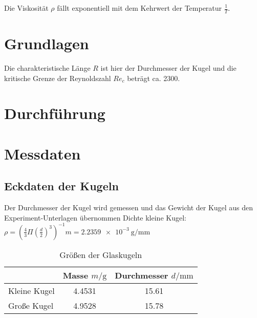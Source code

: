 Die Viskosität $\rho$ fällt exponentiell mit dem Kehrwert der Temperatur $\frac{1}{T}$.

\section{Grundlagen}
Die charakteristische Länge $R$ ist hier der Durchmesser der Kugel und die kritische Grenze der Reynoldszahl $Re_c$ beträgt ca. 2300.

\section{Durchführung}

\section{Messdaten}
\subsection{Eckdaten der Kugeln}
Der Durchmesser der Kugel wird gemessen und das Gewicht der Kugel aus den Experiment-Unterlagen übernommen
Dichte kleine Kugel: $ \rho  = \left(\frac{4}{3}\Pi \left(\frac{d}{2}\right)^{3}\right)^{-1} m = \qty{2.2359e-3}{\g\per\mm}$\\

\begin{table}
    \caption{Größen der Glaskugeln}
    \label{tab:groessen_Kugeln}
    \centering
    \begin{tabular}{l S[table-format=1.4] S[table-format=1.2]}
        \toprule
        & {Masse $m / \unit{\g} $} & {Durchmesser $ d / \unit{\mm}$}\\
        \midrule
        Kleine Kugel    &   4.4531  & 15.61 \\
        Große Kugel     &   4.9528  & 15.78 \\
        \bottomrule

    \end{tabular}
\end{table}



